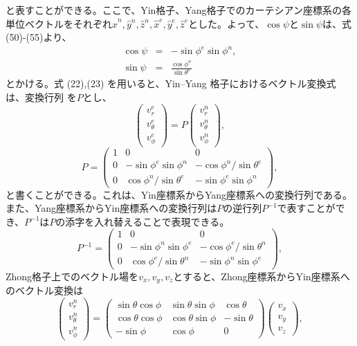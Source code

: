 \documentclass[12pt]{jsarticle}
\begin{document}
と表すことができる。ここで、Yin格子、Yang格子でのカーテシアン座標系の各単位ベクトルをそれぞれ$\hat{x}^n,\hat{y}^n,\hat{z}^n,\hat{x}^e,\hat{y}^e,\hat{z}^e$とした。よって、$\cos\psi$と$\sin\psi$は、式(50)-(55)より、
\begin{eqnarray}
\cos\psi&=&-\sin\phi^e\sin\phi^n, \\
\sin\psi&=&\frac{\cos\phi^n}{\sin\theta^e} 
\end{eqnarray}
とかける。式 (22),(23) を用いると、Yin--Yang 格子におけるベクトル変換式は、変換行列
 を$P$とし、
\begin{equation}
\begin{pmatrix}
v^e_r \\ v^e_\theta \\ v^e_\phi  
\end{pmatrix} 
=
P
\begin{pmatrix}
v^n_r \\ v^n_\theta \\ v^n_\phi  
\end{pmatrix} ,
\end{equation}
\begin{equation}
P=
\begin{pmatrix}
1 & 0 & 0 \\ 0 & -\sin\phi^e\sin\phi^n & -\cos\phi^n/\sin\theta^e \\ 0 & \cos\phi^n/\sin\theta^e & -\sin\phi^e\sin\phi^n
\end{pmatrix} ,
\end{equation}
と書くことができる。これは、Yin座標系からYang座標系への変換行列である。また、Yang座標系からYin座標系への変換行列は$P$の逆行列$P^{-1}$で表すことができ、$P^{-1}$は$P$の添字を入れ替えることで表現できる。
\begin{equation}
P^{-1}=
\begin{pmatrix}
1 & 0 & 0 \\ 0 & -\sin\phi^n\sin\phi^e & -\cos\phi^e/\sin\theta^n \\ 0 & \cos\phi^e/\sin\theta^n & -\sin\phi^n\sin\phi^e
\end{pmatrix} ,
\end{equation}
Zhong格子上でのベクトル場を$v_x,v_y,v_z$とすると、Zhong座標系からYin座標系へのベクトル変換は
\begin{equation}
\begin{pmatrix}
v^n_r \\ v^n_\theta \\ v^n_\phi  
\end{pmatrix} 
=
\begin{pmatrix}
\sin\theta\cos\phi & \sin\theta\sin\phi & \cos\theta \\ \cos\theta\cos\phi & \cos\theta\sin\phi & -\sin\theta \\ -\sin\phi & \cos\phi & 0
\end{pmatrix} 
\begin{pmatrix}
v_x \\ v_y \\ v_z  
\end{pmatrix} ,
\end{equation}
\end{document}
